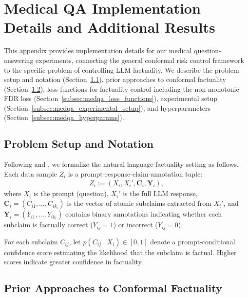 \section{Medical QA Implementation Details and Additional Results}
\label{app:medical_qa}

This appendix provides implementation details for our medical question-answering experiments, connecting the general conformal risk control framework to the specific problem of controlling LLM factuality. We describe the problem setup and notation (Section~\ref{subsec:medqa_setup}), prior approaches to conformal factuality (Section~\ref{subsec:medqa_prior_approaches}), loss functions for factuality control including the non-monotonic FDR loss (Section~\ref{subsec:medqa_loss_functions}), experimental setup (Section~\ref{subsec:medqa_experimental_setup}), and hyperparameters (Section~\ref{subsec:medqa_hyperparams}).

\subsection{Problem Setup and Notation}
\label{subsec:medqa_setup}

Following \citet{mohri2024language} and \citet{cherian2024large}, we formalize the natural language factuality setting as follows. Each data sample $Z_i$ is a prompt-response-claim-annotation tuple:
\begin{align}
    Z_i := (X_i, X_i', \boldsymbol{C}_i, \boldsymbol{Y}_i),
\end{align}
where $X_i$ is the prompt (question), $X_i'$ is the full LLM response, $\boldsymbol{C}_i = (C_{i1}, \ldots, C_{ik_i})$ is the vector of atomic subclaims extracted from $X_i'$, and $\boldsymbol{Y}_i = (Y_{i1}, \ldots, Y_{ik_i})$ contains binary annotations indicating whether each subclaim is factually correct ($Y_{ij} = 1$) or incorrect ($Y_{ij} = 0$).

For each subclaim $C_{ij}$, let $p(C_{ij} \mid X_i) \in [0, 1]$ denote a prompt-conditional confidence score estimating the likelihood that the subclaim is factual. Higher scores indicate greater confidence in factuality.

\subsection{Prior Approaches to Conformal Factuality}
\label{subsec:medqa_prior_approaches}

